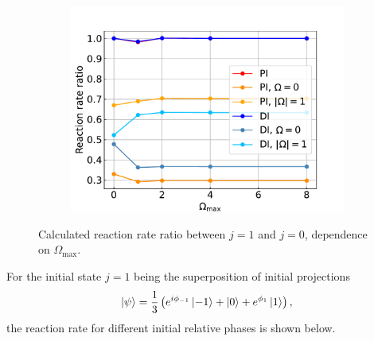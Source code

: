 \documentclass{article}
\begin{document}
    \begin{figure}[H]
        \centering
        \begin{subfigure}{.7\linewidth}
            \centering
            \includegraphics[width=\linewidth]{coriolis_rr_omega_maxes_ratio.pdf}
        \end{subfigure} 
        \caption{Calculated reaction rate ratio between $j = 1$ and $j = 0$, dependence on $\Omega_\text{max}$.}
    \end{figure}

    For the initial state $j = 1$ being the superposition of initial projections
    \begin{equation}
        \ket{\psi} = \frac{1}{3} \left(e^{i\phi_{-1}}\ket{-1} + \ket{0} + e^{\phi_1}\ket{1}\right),
    \end{equation} 
    the reaction rate for different initial relative phases is shown below.
\end{document}
